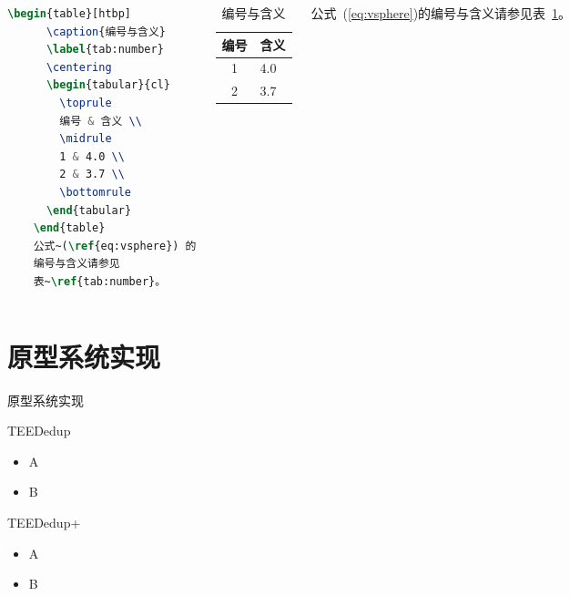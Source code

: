 \documentclass{beamer}
\newcommand{\sysnameS}{TEEDedup }
\newcommand{\prototype}{TEEDedup+ }
\begin{document}
\begin{frame}[fragile]
    \begin{columns}
        \begin{lstlisting}[language=TeX]
    \begin{table}[htbp]
      \caption{编号与含义}
      \label{tab:number}
      \centering
      \begin{tabular}{cl}
        \toprule
        编号 & 含义 \\
        \midrule
        1 & 4.0 \\
        2 & 3.7 \\
        \bottomrule
      \end{tabular}
    \end{table}
    公式~(\ref{eq:vsphere}) 的
    编号与含义请参见
    表~\ref{tab:number}。
\end{lstlisting}
        \begin{table}[htpb]
            \centering
            \caption{编号与含义}
            \label{tab:number}
            \begin{tabular}{cl}\toprule
                编号 & 含义 \\\midrule
                1    & 4.0  \\
                2    & 3.7  \\\bottomrule
            \end{tabular}
        \end{table}
        \normalsize 公式~(\ref{eq:vsphere})的编号与含义请参见表~\ref{tab:number}。
    \end{columns}
\end{frame}

\section{原型系统实现}

\begin{frame}{原型系统实现}
    \begin{textbox}{\sysnameS}
        \begin{itemize}
            \item A
            \item B
        \end{itemize}
    \end{textbox}

    \begin{textbox}{\prototype}
        \begin{itemize}
            \item A
            \item B
        \end{itemize}
    \end{textbox}
\end{frame}
\end{document}
